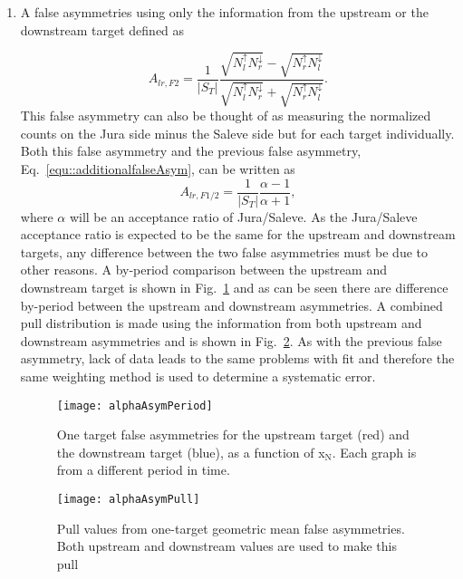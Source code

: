 \begin{enumerate}
\item A false asymmetries using only the information from the upstream or the
  downstream target defined as

  \begin{equation}
    \label{equ::falseANgeomean}
    A_{lr, F2} =
    \frac{1}{|S_T|}
    \frac{\sqrt{N_l^\uparrow N_r^\downarrow}
      - \sqrt{N_r^\uparrow N_l^\downarrow}
    }{
      \sqrt{N_l^\uparrow N_r^\downarrow}
      + \sqrt{N_r^\uparrow N_l^\downarrow}
    }.
  \end{equation}
  This false asymmetry can also be thought of as measuring the normalized counts
  on the Jura side minus the Saleve side but for each target individually.  Both
  this false asymmetry and the previous false asymmetry,
  Eq.~\ref{equ::additionalfalseAsym}, can be written as
  \begin{equation}
    A_{lr,F1/2} =
    \frac{1}{|S_T|}
    \frac{\alpha - 1}{\alpha + 1},
  \end{equation}
  where $\alpha$ will be an acceptance ratio of Jura/Saleve.  As the Jura/Saleve
  acceptance ratio is expected to be the same for the upstream and downstream
  targets, any difference between the two false asymmetries must be due to other
  reasons.  A by-period comparison between the upstream and downstream target is
  shown in Fig.~\ref{fig::alphaAsymPeriod} and as can be seen there are
  difference by-period between the upstream and downstream asymmetries.  A
  combined pull distribution is made using the information from both upstream
  and downstream asymmetries and is shown in Fig.~\ref{fig::alphaAsymPull}.  As
  with the previous false asymmetry, lack of data leads to the same problems
  with fit and therefore the same weighting method is used to determine a
  systematic error.

  \begin{figure}[h!t]
    \centering \texttt{[image: alphaAsymPeriod]}
    \caption{One target false asymmetries for the upstream target (red) and the
      downstream target (blue), as a function of x$_{\mathrm{N}}$.  Each graph
      is from a different period in time.}
    \label{fig::alphaAsymPeriod}
  \end{figure}

  \begin{figure}[h!t]
    \centering
    \texttt{[image: alphaAsymPull]}
    \caption{Pull values from one-target geometric mean false asymmetries.  Both
      upstream and downstream values are used to make this pull}
    \label{fig::alphaAsymPull}
  \end{figure}


\end{enumerate}

